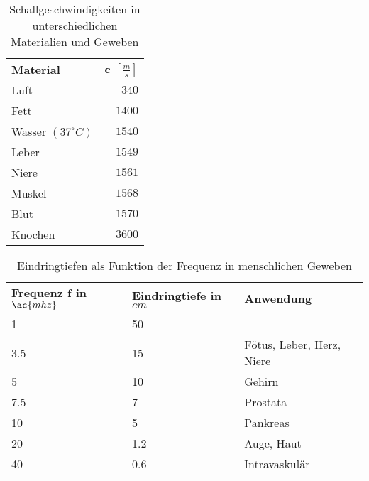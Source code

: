 \hfill
\begin{table}[h!t]
\centering
\caption{Schallgeschwindigkeiten in unterschiedlichen Materialien und Geweben}
\label{tab:Schallgeschwindigkeiten}
\begin{tabular}{l|r}
\textbf{Material} & \textbf{c $\left[\frac{m}{s}\right]$} \\
\cline{1-2}
Luft 				  & $340$	 \\ 
Fett 				  & $1400$	 \\ 
Wasser $(37^\circ C)$ & $1540$	 \\ 
Leber 				  & $1549$ 	 \\ 
Niere 				  & $1561$ 	 \\ 
Muskel 				  & $1568$ 	 \\ 
Blut 				  & $1570$ 	 \\ 
Knochen 			  & $3600$ 	 \\ 
\end{tabular}
\end{table}
\begin{table}[h!t]
\centering
\caption{Eindringtiefen als Funktion der Frequenz in menschlichen Geweben}
\label{tab:Eindringtiefen}
\begin{tabular}{l|l|l}
\textbf{Frequenz f in $\ac{mhz}$} & \textbf{Eindringtiefe in $cm$} & \textbf{Anwendung} \\
\cline{1-3}
1 	& 50	& 	 \\ 
3.5 & 15	& Fötus, Leber, Herz, Niere	 \\ 
5 	& 10	& Gehirn \\ 
7.5 & 7 	& Prostata \\ 
10 	& 5 	& Pankreas \\ 
20 	& 1.2 	& Auge, Haut \\ 
40 	& 0.6 	& Intravaskulär \\ 
\end{tabular}
\end{table}